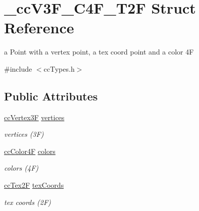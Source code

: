 \hypertarget{struct__cc_v3_f___c4_f___t2_f}{\section{\-\_\-cc\-V3\-F\-\_\-\-C4\-F\-\_\-\-T2\-F Struct Reference}
\label{struct__cc_v3_f___c4_f___t2_f}
}


a Point with a vertex point, a tex coord point and a color 4\-F  




{\ttfamily \#include $<$cc\-Types.\-h$>$}

\subsection*{Public Attributes}
\begin{DoxyCompactItemize}
\item 
\hypertarget{struct__cc_v3_f___c4_f___t2_f_a374748038b7846a8ce20fd3aa9d7ab9e}{\hyperlink{cc_types_8h_a351ac51e9885af9a15676faf8cb49f8a}{cc\-Vertex3\-F} \hyperlink{struct__cc_v3_f___c4_f___t2_f_a374748038b7846a8ce20fd3aa9d7ab9e}{vertices}}\label{struct__cc_v3_f___c4_f___t2_f_a374748038b7846a8ce20fd3aa9d7ab9e}

\begin{DoxyCompactList}\small\item\em vertices (3\-F) \end{DoxyCompactList}\item 
\hypertarget{struct__cc_v3_f___c4_f___t2_f_adb0fa9f9efadd1c831519f51ceeb1812}{\hyperlink{cc_types_8h_aecc18290defe020343f1d7bb2ee73145}{cc\-Color4\-F} \hyperlink{struct__cc_v3_f___c4_f___t2_f_adb0fa9f9efadd1c831519f51ceeb1812}{colors}}\label{struct__cc_v3_f___c4_f___t2_f_adb0fa9f9efadd1c831519f51ceeb1812}

\begin{DoxyCompactList}\small\item\em colors (4\-F) \end{DoxyCompactList}\item 
\hypertarget{struct__cc_v3_f___c4_f___t2_f_a83b59556b042419ad2337cba3768c4ea}{\hyperlink{cc_types_8h_a95226f1345c203215cc1f419aafe47c5}{cc\-Tex2\-F} \hyperlink{struct__cc_v3_f___c4_f___t2_f_a83b59556b042419ad2337cba3768c4ea}{tex\-Coords}}\label{struct__cc_v3_f___c4_f___t2_f_a83b59556b042419ad2337cba3768c4ea}

\begin{DoxyCompactList}\small\item\em tex coords (2\-F) \end{DoxyCompactList}\end{DoxyCompactItemize}


